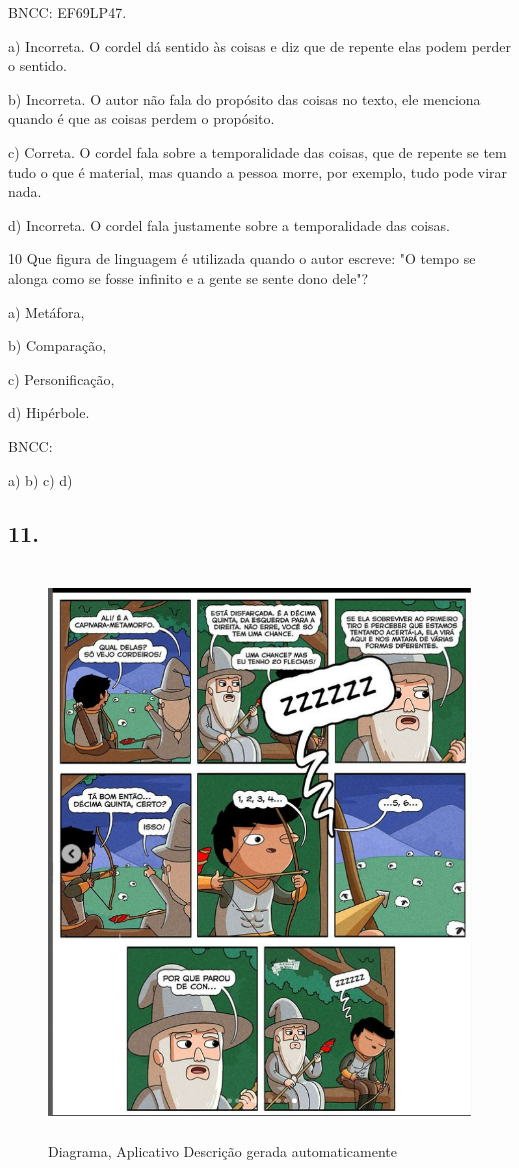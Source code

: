 BNCC: EF69LP47.

a) Incorreta. O cordel dá sentido às coisas e diz que de repente elas
podem perder o sentido.

b) Incorreta. O autor não fala do propósito das coisas no texto, ele
menciona quando é que as coisas perdem o propósito.

c) Correta. O cordel fala sobre a temporalidade das coisas, que de
repente se tem tudo o que é material, mas quando a pessoa morre, por
exemplo, tudo pode virar nada.

d) Incorreta. O cordel fala justamente sobre a temporalidade das coisas.

\num{10} Que figura de linguagem é utilizada quando o autor escreve: "O
tempo se alonga como se fosse infinito e a gente se sente dono dele"?

a) Metáfora,

b) Comparação,

c) Personificação,

d) Hipérbole.

BNCC:

a) b) c) d)


\subsection{11.}

\begin{figure}
\centering
\includegraphics[width=4.77759in,height=5.95in]{./imgSAEB_6_POR/media/image50.png}
\caption{Diagrama, Aplicativo Descrição gerada automaticamente}
\end{figure}


